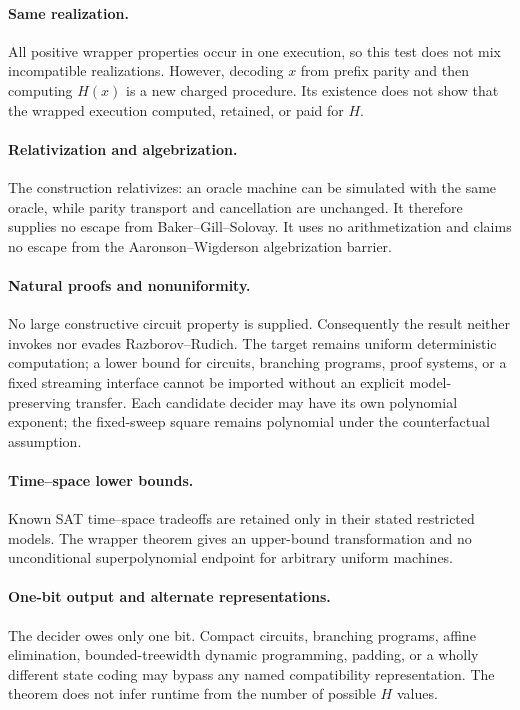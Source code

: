 \documentclass[11pt]{article}
\begin{document}
\paragraph{Same realization.}
All positive wrapper properties occur in one execution, so this test does not
mix incompatible realizations.  However, decoding $x$ from prefix parity and
then computing $H(x)$ is a new charged procedure.  Its existence does not show
that the wrapped execution computed, retained, or paid for $H$.

\paragraph{Relativization and algebrization.}
The construction relativizes: an oracle machine can be simulated with the
same oracle, while parity transport and cancellation are unchanged.  It
therefore supplies no escape from Baker--Gill--Solovay.  It uses no
arithmetization and claims no escape from the Aaronson--Wigderson
algebrization barrier.

\paragraph{Natural proofs and nonuniformity.}
No large constructive circuit property is supplied.  Consequently the result
neither invokes nor evades Razborov--Rudich.  The target remains uniform
deterministic computation; a lower bound for circuits, branching programs,
proof systems, or a fixed streaming interface cannot be imported without an
explicit model-preserving transfer.  Each candidate decider may have its own
polynomial exponent; the fixed-sweep square remains polynomial under the
counterfactual assumption.

\paragraph{Time--space lower bounds.}
Known SAT time--space tradeoffs are retained only in their stated restricted
models.  The wrapper theorem gives an upper-bound transformation and no
unconditional superpolynomial endpoint for arbitrary uniform machines.

\paragraph{One-bit output and alternate representations.}
The decider owes only one bit.  Compact circuits, branching programs, affine
elimination, bounded-treewidth dynamic programming, padding, or a wholly
different state coding may bypass any named compatibility representation.
The theorem does not infer runtime from the number of possible $H$ values.
\end{document}

